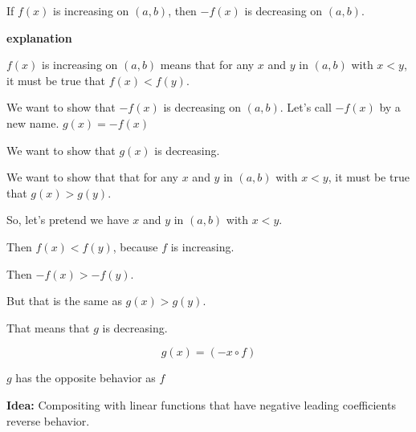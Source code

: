\documentclass{ximera}
\begin{document}
\begin{fact}

If $f(x)$ is increasing on $(a, b)$, then $-f(x)$ is decreasing on $(a, b)$.

\textbf{\textcolor{red!75!green}{explanation}} 

$f(x)$ is increasing on $(a, b)$ means that for any $x$ and $y$ in $(a, b)$ with $x < y$, it must be true that $f(x) < f(y)$.


We want to show that $-f(x)$ is decreasing on $(a, b)$.  Let's call $-f(x)$ by a new name.  $g(x) = -f(x)$

We want to show that $g(x)$ is decreasing.

We want to show that that for any $x$ and $y$ in $(a, b)$ with $x < y$, it must be true that $g(x) > g(y)$.



So, let's pretend we have $x$ and $y$ in $(a, b)$ with $x < y$.

Then $f(x) < f(y)$, because $f$ is increasing.

Then $-f(x) > -f(y)$.

But that is the same as $g(x) > g(y)$.

That means that $g$ is decreasing.


\[ g(x) = (-x \circ f) \]

\begin{center}
$g$ has the opposite behavior as $f$
\end{center}


\end{fact}




\textbf{Idea:} Compositing with linear functions that have negative leading coefficients reverse behavior.
\end{document}
